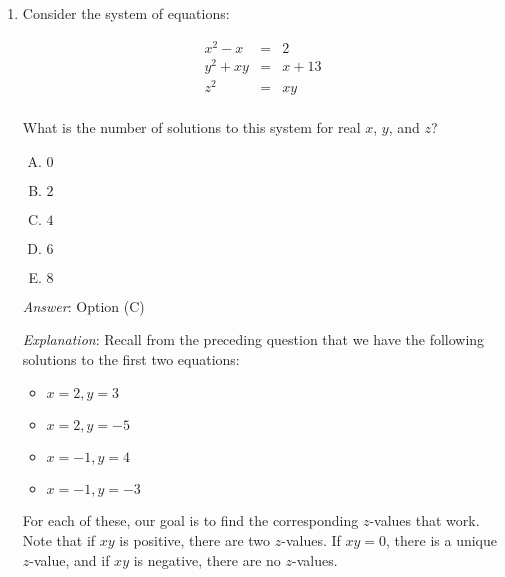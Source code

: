 \documentclass[10pt]{amsart}
\begin{document}
\begin{enumerate}
  Overall, we have four solutions:

  \begin{itemize}
  \item $x = 2, y = 3$
  \item $x = 2, y = -5$
  \item $x = -1, y = 4$
  \item $x = -1, y = -3$
  \end{itemize}

  {\em Performance review}: $26$ out of $27$ got this. $1$ chose (D).

  {\em Historical note (last time)}: $28$ out of $29$ got this. $1$
  chose (D).

\item Consider the system of equations:

  \begin{eqnarray*}
    x^2 - x & = & 2 \\
    y^2 + xy & = & x + 13 \\
    z^2 & = & xy \\
  \end{eqnarray*}

  What is the number of solutions to this system for real $x$, $y$,
  and $z$?

  \begin{enumerate}[(A)]
  \item $0$
  \item $2$
  \item $4$
  \item $6$
  \item $8$
  \end{enumerate}

  {\em Answer}: Option (C)

  {\em Explanation}: Recall from the preceding question that we have
  the following solutions to the first two equations:

  \begin{itemize}
  \item $x = 2, y = 3$
  \item $x = 2, y = -5$
  \item $x = -1, y = 4$
  \item $x = -1, y = -3$
  \end{itemize}

  For each of these, our goal is to find the corresponding $z$-values
  that work. Note that if $xy$ is positive, there are two
  $z$-values. If $xy = 0$, there is a unique $z$-value, and if $xy$ is
  negative, there are no $z$-values.


\end{enumerate}
\end{document}
